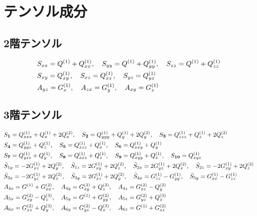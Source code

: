\documentclass[11pt]{easymemo}
\begin{document}
\section{テンソル成分}\label{app1}

\subsection{2階テンソル}
\begin{align}
&
S_{xx}=Q^{(1)} + Q^{(1)}_{xx},
\quad
S_{yy}=Q^{(1)} + Q^{(1)}_{yy},
\quad
S_{zz}=Q^{(1)} + Q^{(1)}_{zz}
\cr&
S_{xy}=Q^{(1)}_{xy},
\quad
S_{xz}=Q^{(1)}_{xz},
\quad
S_{yz}=Q^{(1)}_{yz}
\\&
A_{yz}=G^{(1)}_{x},
\quad
A_{zx}=G^{(1)}_{y},
\quad
A_{xy}=G^{(1)}_{z}
\end{align}

\subsection{3階テンソル}
\begin{align}
&
S_{\textbf{1}}=Q^{(1)}_{xxx} + Q^{(1)}_{x} + 2Q^{(2)}_{x},
\quad
S_{\textbf{2}}=Q^{(1)}_{yyy} + Q^{(1)}_{y} + 2Q^{(2)}_{y},
\quad
S_{\textbf{3}}=Q^{(1)}_{zzz} + Q^{(1)}_{z} + 2Q^{(2)}_{z}
\cr&
S_{\textbf{4}}=Q^{(1)}_{yyz} + Q^{(1)}_{z},
\quad
S_{\textbf{5}}=Q^{(1)}_{xzz} + Q^{(1)}_{x},
\quad
S_{\textbf{6}}=Q^{(1)}_{xxy} + Q^{(1)}_{y}
\cr&
S_{\textbf{7}}=Q^{(1)}_{yzz} + Q^{(1)}_{y},
\quad
S_{\textbf{8}}=Q^{(1)}_{xxz} + Q^{(1)}_{z},
\quad
S_{\textbf{9}}=Q^{(1)}_{xyy} + Q^{(1)}_{x},
\quad
S_{\textbf{10}}=Q^{(1)}_{xyz}
\cr&
\bar{S}_{1y}=-2G^{(1)}_{xz} + 2Q^{(2)}_{y},
\quad
\bar{S}_{1z}=2G^{(1)}_{xy} + 2Q^{(2)}_{z},
\quad
\bar{S}_{2x}=2G^{(1)}_{yz} + 2Q^{(2)}_{x},
\quad
\bar{S}_{2z}=-2G^{(1)}_{xy} + 2Q^{(2)}_{z}
\cr&
\bar{S}_{3x}=-2G^{(1)}_{yz} + 2Q^{(2)}_{x},
\quad
\bar{S}_{3y}=2G^{(1)}_{xz} + 2Q^{(2)}_{y},
\quad
\bar{S}_{4x}=G^{(1)}_{zz} - G^{(1)}_{yy},
\quad
\bar{S}_{5y}=G^{(1)}_{xx} - G^{(1)}_{zz}
\\&
A_{4x}=G^{(1)} + G^{(2)}_{xx},
\quad
A_{4y}=G^{(2)}_{xy} + Q^{(3)}_{z},
\quad
A_{4z}=G^{(2)}_{xz} - Q^{(3)}_{y}
\cr&
A_{5x}=G^{(2)}_{xy} - Q^{(3)}_{z},
\quad
A_{5y}=G^{(1)} + G^{(2)}_{yy},
\quad
A_{5z}=G^{(2)}_{yz} + Q^{(3)}_{x}
\cr&
A_{6x}=G^{(2)}_{xz} + Q^{(3)}_{y},
\quad
A_{6y}=G^{(2)}_{yz} - Q^{(3)}_{x},
\quad
A_{6z}=G^{(1)} + G^{(2)}_{zz}
\end{align}
\end{document}

